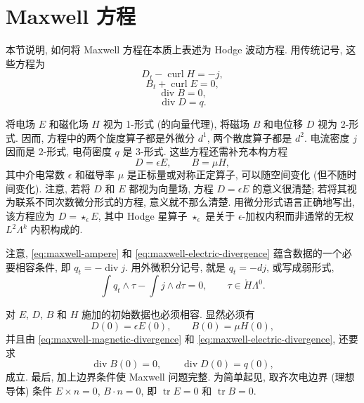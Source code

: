 \section{{Maxwell 方程}}\label{sec:maxwell-equations}

{本节说明, 如何将 Maxwell 方程在本质上表述为 Hodge 波动方程. 用传统记号, 这些方程为}
\begin{equation}\label{eq:maxwell-ampere}D_t-\operatorname{curl}H=-j,\end{equation}
\begin{equation}\label{eq:maxwell-faraday}B_t+\operatorname{curl}E=0,\end{equation}
\begin{equation}\label{eq:maxwell-magnetic-divergence}\operatorname{div}B=0,\end{equation}
\begin{equation}\label{eq:maxwell-electric-divergence}\operatorname{div}D=q.\end{equation}

{将电场 $E$ 和磁化场 $H$ 视为 1-形式 (的向量代理), 将磁场 $B$ 和电位移 $D$ 视为 2-形式. 因而, 方程中的两个旋度算子都是外微分 $d^1$, 两个散度算子都是 $d^2$. 电流密度 $j$ 因而是 2-形式, 电荷密度 $q$ 是 3-形式. 这些方程还需补充本构方程}
\[
D=\epsilon E,\qquad B=\mu H,
\]
{其中介电常数 $\epsilon$ 和磁导率 $\mu$ 是正标量或对称正定算子, 可以随空间变化 (但不随时间变化). 注意, 若将 $D$ 和 $E$ 都视为向量场, 方程 $D=\epsilon E$ 的意义很清楚; 若将其视为联系不同次数微分形式的方程, 意义就不那么清楚. 用微分形式语言正确地写出, 该方程应为 $D=\star_\epsilon E$, 其中 Hodge 星算子 $\star_\epsilon$ 是关于 $\epsilon$-加权内积而非通常的无权 $L^2\Lambda^k$ 内积构成的.}

{注意, \eqref{eq:maxwell-ampere} 和 \eqref{eq:maxwell-electric-divergence} 蕴含数据的一个必要相容条件, 即 $q_t=-\operatorname{div}j$. 用外微积分记号, 就是 $q_t=-dj$, 或写成弱形式,}
\begin{equation}\label{eq:maxwell-data-compatibility}
\int q_t\wedge\tau-\int j\wedge d\tau=0,\qquad\tau\in\mathring H\Lambda^0.
\end{equation}

{对 $E$, $D$, $B$ 和 $H$ 施加的初始数据也必须相容. 显然必须有}
\[
D(0)=\epsilon E(0),\qquad B(0)=\mu H(0),
\]
{并且由 \eqref{eq:maxwell-magnetic-divergence} 和 \eqref{eq:maxwell-electric-divergence}, 还要求}
\[
\operatorname{div}B(0)=0,\qquad\operatorname{div}D(0)=q(0),
\]
{成立. 最后, 加上边界条件使 Maxwell 问题完整. 为简单起见, 取齐次电边界 (理想导体) 条件 $E\times n=0$, $B\cdot n=0$, 即 $\operatorname{tr}E=0$ 和 $\operatorname{tr}B=0$.}

